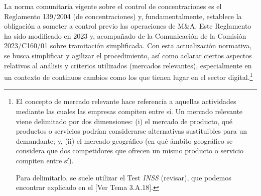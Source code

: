 \documentclass[10pt,a4paper]{article}
\newcommand{\authorfont}[1]{{\fontfamily{EBGaramond-TLF}\selectfont #1}}
\begin{document}
La norma comunitaria vigente sobre el control de concentraciones es el Reglamento 139/2004 (de concentraciones) y, fundamentalmente, establece la obligación a someter a control previo las operaciones de M\&A. Este Reglamento ha sido modificado en 2023 y, acompañado de la Comunicación de la Comisión 2023/C160/01 sobre tramitación simplificada. Con esta actualización normativa, se busca simplificar y agilizar el procedimiento, así como aclarar ciertos aspectos relativos al análisis y criterios utilizados (mercados relevantes), especialmente en un contexto de continuos cambios como los que tienen lugar en el sector digital.\footnote{%
    El concepto de mercado relevante hace referencia a aquellas actividades mediante las cuales las empresas compiten entre sí. Un mercado relevante viene delimitado por dos dimensiones: (i) el mercado de producto, qué productos o servicios podrían considerarse alternativas sustituibles para un demandante; y, (ii) el mercado geográfico (en qué ámbito geográfico se considera que dos competidores que ofrecen un mismo producto o servicio compiten entre sí). 

Para delimitarlo, se suele utilizar el Test \textit{INSS} (revisar), que podemos encontrar explicado en el [\authorfont{Ver Tema 3.A.18}].
}
\end{document}
